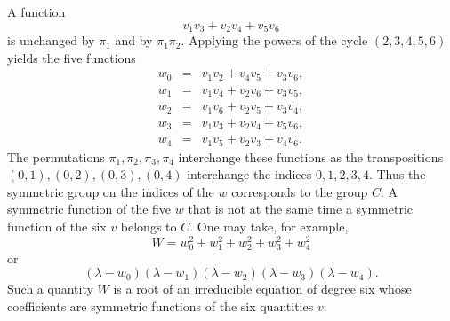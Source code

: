 \documentclass[11pt]{article}
\begin{document}
A function
\[
  v_1v_3+v_2v_4+v_5v_6
\]
is unchanged by $\pi_1$ and by $\pi_1\pi_2$. Applying the powers of the cycle $(2,3,4,5,6)$ yields the five functions
\[
\begin{array}{rcl}
 w_0&=&v_1v_2+v_4v_5+v_3v_6,\\
 w_1&=&v_1v_4+v_2v_6+v_3v_5,\\
 w_2&=&v_1v_6+v_2v_5+v_3v_4,\\
 w_3&=&v_1v_3+v_2v_4+v_5v_6,\\
 w_4&=&v_1v_5+v_2v_3+v_4v_6.
\end{array}                                                       \tag{2}
\]
The permutations $\pi_1,\pi_2,\pi_3,\pi_4$ interchange these functions as the transpositions $(0,1),(0,2),(0,3),(0,4)$ interchange the indices $0,1,2,3,4$. Thus the symmetric group on the indices of the $w$ corresponds to the group $C$. A symmetric function of the five $w$ that is not at the same time a symmetric function of the six $v$ belongs to $C$. One may take, for example,
\[
  W=w_0^2+w_1^2+w_2^2+w_3^2+w_4^2
\]
or
\[
  (\lambda-w_0)(\lambda-w_1)(\lambda-w_2)(\lambda-w_3)(\lambda-w_4).
\]
Such a quantity $W$ is a root of an irreducible equation of degree six whose coefficients are symmetric functions of the six quantities $v$.
\end{document}
